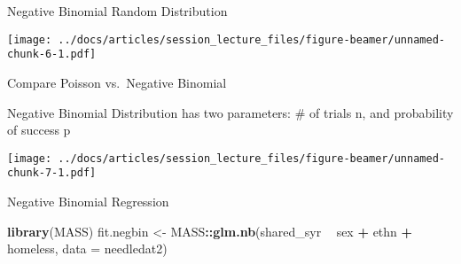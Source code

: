 \documentclass[
  ignorenonframetext,
]{beamer}
\newenvironment{Shaded}{\begin{snugshade}}{\end{snugshade}}
\newcommand{\DataTypeTok}[1]{\textcolor[rgb]{0.13,0.29,0.53}{#1}}
\newcommand{\KeywordTok}[1]{\textcolor[rgb]{0.13,0.29,0.53}{\textbf{#1}}}
\newcommand{\NormalTok}[1]{#1}
\newcommand{\OperatorTok}[1]{\textcolor[rgb]{0.81,0.36,0.00}{\textbf{#1}}}
\newcommand{\StringTok}[1]{\textcolor[rgb]{0.31,0.60,0.02}{#1}}
\begin{document}
\begin{frame}{Negative Binomial Random Distribution}
\protect\hypertarget{negative-binomial-random-distribution}{}

\texttt{[image: ../docs/articles/session\_lecture\_files/figure-beamer/unnamed-chunk-6-1.pdf]}

\end{frame}

\begin{frame}{Compare Poisson vs.~Negative Binomial}
\protect\hypertarget{compare-poisson-vs.-negative-binomial}{}

Negative Binomial Distribution has two parameters: \# of trials n, and
probability of success p

\texttt{[image: ../docs/articles/session\_lecture\_files/figure-beamer/unnamed-chunk-7-1.pdf]}

\end{frame}

\begin{frame}[fragile]{Negative Binomial Regression}
\protect\hypertarget{negative-binomial-regression}{}

\begin{Shaded}
\begin{Highlighting}[]
\KeywordTok{library}\NormalTok{(MASS)}
\NormalTok{fit.negbin <-}\StringTok{ }\NormalTok{MASS}\OperatorTok{::}\KeywordTok{glm.nb}\NormalTok{(shared_syr }\OperatorTok{~}\StringTok{ }\NormalTok{sex }\OperatorTok{+}
\StringTok{                             }\NormalTok{ethn }\OperatorTok{+}\StringTok{ }\NormalTok{homeless,}
                           \DataTypeTok{data =}\NormalTok{ needledat2)}
\end{Highlighting}
\end{Shaded}

\end{frame}
\end{document}
